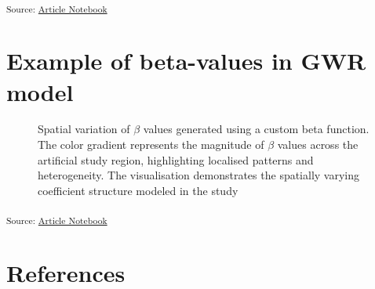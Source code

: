 \documentclass[
  default,
]{sn-jnl}
\begin{document}
\begin{table}
{}

\end{table}%

\textsubscript{Source:
\href{https://indiraputeri-phd.github.io/CAR_simcomp/manuscript.qmd.html}{Article
Notebook}}

\section{Example of beta-values in GWR model}\label{secA4}

\label{cell-fig-betaplot}
\begin{figure}[H]


\caption{\label{fig-betaplot}Spatial variation of \(\beta\) values
generated using a custom beta function. The color gradient represents
the magnitude of \(\beta\) values across the artificial study region,
highlighting localised patterns and heterogeneity. The visualisation
demonstrates the spatially varying coefficient structure modeled in the
study}

\end{figure}%

\textsubscript{Source:
\href{https://indiraputeri-phd.github.io/CAR_simcomp/manuscript.qmd.html}{Article
Notebook}}

\section*{References}\label{references}
\end{document}
